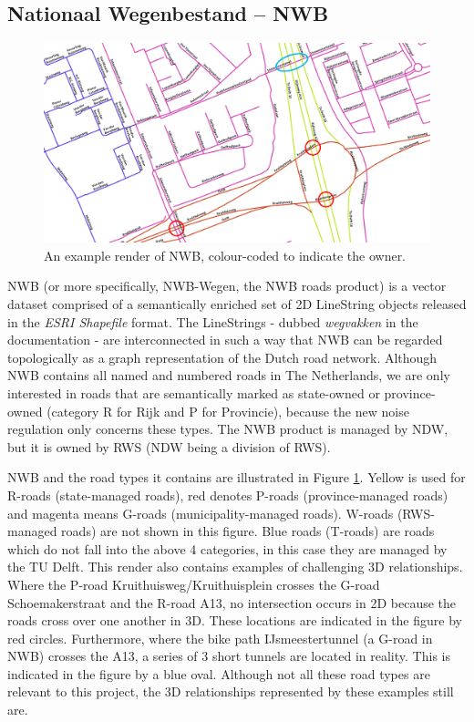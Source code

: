 \subsection{Nationaal Wegenbestand – NWB}
\label{sub:nwb}

\begin{figure}
    \centering
    \includegraphics[width=\linewidth]{final_report/figs/nwb_sample_02.png} 
    \caption{An example render of NWB, colour-coded to indicate the owner.}
    \label{fig:nwb}
\end{figure}

NWB (or more specifically, NWB-Wegen, the NWB roads product) is a vector dataset comprised of a semantically enriched set of 2D LineString objects released in the \textit{ESRI Shapefile} format. The LineStrings - dubbed \textit{wegvakken} in the documentation - are interconnected in such a way that NWB can be regarded topologically as a graph representation of the Dutch road network. Although NWB contains all named and numbered roads in The Netherlands, we are only interested in roads that are semantically marked as state-owned or province-owned (category R for Rijk and P for Provincie), because the new noise regulation only concerns these types. The NWB product is managed by NDW, but it is owned by RWS (NDW being a division of RWS).

NWB and the road types it contains are illustrated in Figure \ref{fig:nwb}. Yellow is used for R-roads (state-managed roads), red denotes P-roads (province-managed roads) and magenta means G-roads (municipality-managed roads). W-roads (RWS-managed roads) are not shown in this figure. Blue roads (T-roads) are roads which do not fall into the above 4 categories, in this case they are managed by the TU Delft. This render also contains examples of challenging 3D relationships. Where the P-road Kruithuisweg/Kruithuisplein crosses the G-road Schoemakerstraat and the R-road A13, no intersection occurs in 2D because the roads cross over one another in 3D. These locations are indicated in the figure by red circles. Furthermore, where the bike path IJsmeestertunnel (a G-road in NWB) crosses the A13, a series of 3 short tunnels are located in reality. This is indicated in the figure by a blue oval. Although not all these road types are relevant to this project, the 3D relationships represented by these examples still are.

